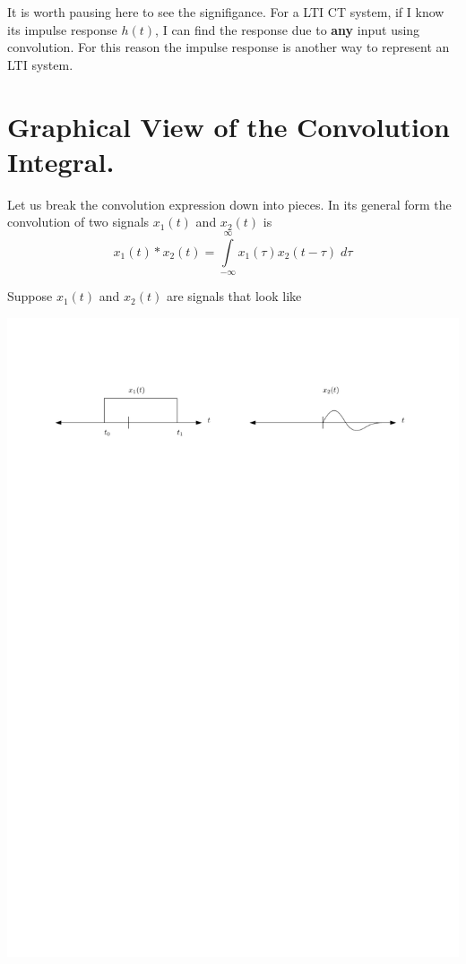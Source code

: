 It is worth pausing here to see the signifigance. For a LTI CT system, if I know its impulse response $h(t)$, I can find the response due to \textbf{any} input using convolution. For this reason the impulse response is another way to represent an LTI system.

\section{Graphical View of the Convolution Integral.}

Let us break the convolution expression down into pieces. In its general form the convolution of two signals $x_1(t)$ and $x_2(t)$ is
\[
x_1(t) * x_2(t) = \int\limits_{-\infty}^{\infty} x_1(\tau)x_2(t-\tau) \; d\tau
\]

Suppose $x_1(t)$ and $x_2(t)$ are signals that look like
\begin{center}
  \includegraphics[scale=1]{graphics/convolution-explain1.pdf}
\end{center}

